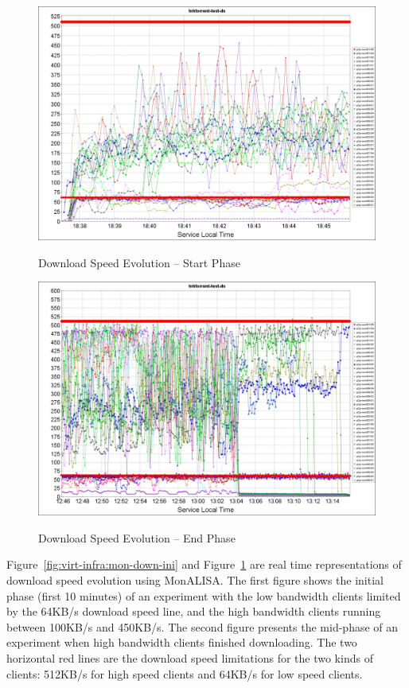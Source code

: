 \begin{figure}
  \centering
  \begin{minipage}{0.8\textwidth}
    \includegraphics[width=\textwidth]{src/img/virt-infra/test-monalisa-virt-env-start.png}
    \caption{Download Speed Evolution -- Start Phase}
    \label{fig:virt-infra:mon-down-ini}
    \vspace{0.2cm}
    \includegraphics[width=\textwidth]{src/img/virt-infra/test-monalisa-virt-env-stop.png}
    \caption{Download Speed Evolution -- End Phase}
    \label{fig:virt-infra:mon-down-fin}
  \end{minipage}
\end{figure}

Figure~\ref{fig:virt-infra:mon-down-ini} and
Figure~\ref{fig:virt-infra:mon-down-fin} are real time representations of
download speed evolution using MonALISA. The first figure shows the initial
phase (first 10 minutes) of an experiment with the low bandwidth clients
limited by the 64KB/s download speed line, and the high bandwidth clients
running between 100KB/s and 450KB/s. The second figure presents the mid-phase
of an experiment when high bandwidth clients finished downloading. The two
horizontal red lines are the download speed limitations for the two kinds of
clients: 512KB/s for high speed clients and 64KB/s for low speed clients.

